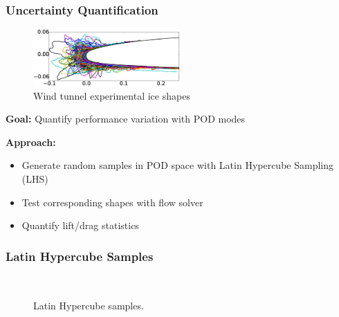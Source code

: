 \documentclass[9pt]{beamer}
\begin{document}
\begin{frame}
\frametitle{Uncertainty Quantification}
\label{sec-2-8}

\vspace*{-0.0cm}\begin{figure}
      \includegraphics[width=0.5\textwidth]{GlobalDataSet}
      \caption{Wind tunnel experimental ice shapes}
\end{figure}
\textbf{Goal:} Quantify performance variation with POD modes

\textbf{Approach:}
\begin{itemize}
\item Generate random samples in POD space with Latin Hypercube Sampling (LHS)
\item Test corresponding shapes with flow solver
\item Quantify lift/drag statistics
\end{itemize}
\end{frame}
\begin{frame}
\frametitle{Latin Hypercube Samples}
\label{sec-2-9}

\vspace*{-0.0cm}\begin{figure}
      \vspace*{-1.5cm} \\
      \vspace*{-0.5cm}
      \vspace*{-0.5cm}
      \caption{Latin Hypercube samples.}
\end{figure}
\end{frame}
\end{document}
